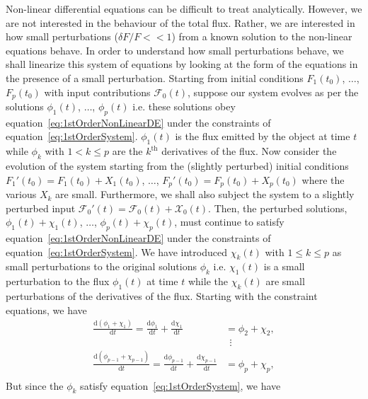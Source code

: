 \documentclass[a4paper,fleqn,usenatbib]{mnras}
\begin{document}
Non-linear differential equations can be difficult to treat analytically. However, we are not interested in the behaviour of the total flux. Rather, we are interested in how small perturbations ($\delta F/F << 1$) from a known solution to the non-linear equations behave. In order to understand how small perturbations behave, we shall linearize this system of equations by looking at the form of the equations in the presence of a small perturbation. Starting from initial conditions $F_{1}(t_{0})$, $\ldots$, $F_{p}(t_{0})$ with input contributions $\mathcal{F}_{0}(t)$, suppose our system evolves as per the solutions $\phi_{1}(t)$, $\ldots$, $\phi_{p}(t)$ i.e. these solutions obey equation~\eqref{eq:1stOrderNonLinearDE} under the constraints of equation~\eqref{eq:1stOrderSystem}. $\phi_{1}(t)$ is the flux emitted by the object at time $t$ while $\phi_{k}$ with $1 < k \leq p$ are the $k^{\mathrm{th}}$ derivatives of the flux. Now consider the evolution of the system starting from the (slightly perturbed) initial conditions $F_{1}'(t_{0}) = F_{1}(t_{0}) + X_{1}(t_{0})$, $\ldots$, $F_{p}'(t_{0}) = F_{p}(t_{0}) + X_{p}(t_{0})$ where the various $X_{k}$ are small. Furthermore, we shall also subject the system to a slightly perturbed input  $\mathcal{F}_{0}'(t) =  \mathcal{F}_{0}(t) +  \mathcal{X}_{0}(t)$. Then, the perturbed solutions, $\phi_{1}(t) + \chi_{1}(t)$, $\ldots$, $\phi_{p}(t) + \chi_{p}(t)$, must continue to satisfy equation~\eqref{eq:1stOrderNonLinearDE} under the constraints of equation~\eqref{eq:1stOrderSystem}. We have introduced $\chi_{k}(t)$ with $1 \leq k \leq p$ as small perturbations to the original solutions $\phi_{k}$ i.e. $\chi_{1}(t)$ is a small perturbation to the flux $\phi_{1}(t)$ at time $t$ while the $\chi_{k}(t)$ are small perturbations of the derivatives of the flux. Starting with the constraint equations, we have
\begin{equation}\label{eq:1stOrderPerturnedSystem}
\begin{aligned}
\frac{\mathrm{d}(\phi_{1} + \chi_{1})}{\mathrm{d}t} = \frac{\mathrm{d}\phi_{1}}{\mathrm{d}t} + \frac{\mathrm{d}\chi_{1}}{\mathrm{d}t} &= \phi_{2} + \chi_{2},\\
&\ \ \vdots \\
\frac{\mathrm{d}(\phi_{p-1} + \chi_{p-1})}{\mathrm{d}t} = \frac{\mathrm{d}\phi_{p-1}}{\mathrm{d}t} + \frac{\mathrm{d}\chi_{p-1}}{\mathrm{d}t} &= \phi_{p} + \chi_{p},\\
\end{aligned}
\end{equation}
But since the $\phi_{k}$ satisfy equation~\eqref{eq:1stOrderSystem}, we have
\end{document}
